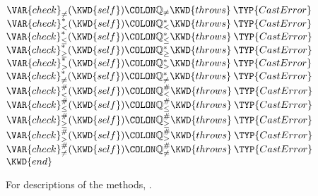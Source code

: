 \begin{Fortress}
\(  \VAR{check}_{\neq}(\KWD{self})\COLON \mathbb{Q}_{\neq} \KWD{throws}\:\TYP{CastError}\)\\
\(  \VAR{check}^*_{<}(\KWD{self})\COLON \mathbb{Q}^*_{<} \KWD{throws}\:\TYP{CastError}\)\\
\(  \VAR{check}^*_{\leq}(\KWD{self})\COLON \mathbb{Q}^*_{\leq} \KWD{throws}\:\TYP{CastError}\)\\
\(  \VAR{check}^*_{\geq}(\KWD{self})\COLON \mathbb{Q}^*_{\geq} \KWD{throws}\:\TYP{CastError}\)\\
\(  \VAR{check}^*_{>}(\KWD{self})\COLON \mathbb{Q}^*_{>} \KWD{throws}\:\TYP{CastError}\)\\
\(  \VAR{check}^*_{\neq}(\KWD{self})\COLON \mathbb{Q}^*_{\neq} \KWD{throws}\:\TYP{CastError}\)\\
\(  \VAR{check}^{\#}_{<}(\KWD{self})\COLON \mathbb{Q}^{\#}_{<} \KWD{throws}\:\TYP{CastError}\)\\
\(  \VAR{check}^{\#}_{\leq}(\KWD{self})\COLON \mathbb{Q}^{\#}_{\leq} \KWD{throws}\:\TYP{CastError}\)\\
\(  \VAR{check}^{\#}_{\geq}(\KWD{self})\COLON \mathbb{Q}^{\#}_{\geq} \KWD{throws}\:\TYP{CastError}\)\\
\(  \VAR{check}^{\#}_{>}(\KWD{self})\COLON \mathbb{Q}^{\#}_{>} \KWD{throws}\:\TYP{CastError}\)\\
\(  \VAR{check}^{\#}_{\neq}(\KWD{self})\COLON \mathbb{Q}^{\#}_{\neq} \KWD{throws}\:\TYP{CastError}\)\-\\\poptabs
\(\KWD{end}\)
\end{Fortress}

For descriptions of the methods, .
